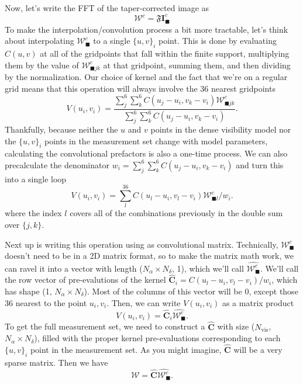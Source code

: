 \documentclass[modern]{aastex62}
\newcommand{\im}{\boldsymbol{I}_\blacksquare}
\newcommand{\vm}{\boldsymbol{\mathcal{W}}} %
\begin{document}
Now, let's write the FFT of the taper-corrected image as 
\begin{equation}
    \vm^c = \mathfrak{F} \im^c
\end{equation}
To make the interpolation/convolution process a bit more tractable, let's think about interpolating $\vm^c_\blacksquare$ to a single $\{u, v\}_i$ point. This is done by evaluating $C(u, v)$ at all of the gridpoints that fall within the finite support, multiplying them by the value of $\mathcal{W}^c_{\blacksquare jk}$ at that gridpoint, summing them, and then dividing by the normalization. Our choice of kernel and the fact that we're on a regular grid means that this operation will always involve the 36 nearest gridpoints
\begin{equation}
    V(u_i, v_i) = \frac{\sum_j^6 \sum_k^6 C(u_j - u_i, v_k - v_i) \mathcal{W}^c_{\blacksquare jk}}{\sum_j^6 \sum_k^6 C(u_j - u_i, v_k - v_i)}.
\end{equation}
Thankfully, because neither the $u$ and $v$ points in the dense visibility model nor the $\{u,v\}_i$ points in the measurement set change with model parameters, calculating the convolutional prefactors is also a one-time process. We can also precalculate the denominator $w_i = \sum_j^6 \sum_k^6 C(u_j - u_i, v_k - v_i)$ and turn this into a single loop
\begin{equation}
 V(u_i, v_i) = \sum_l^{36} C(u_l - u_i, v_l - v_i) \mathcal{W}^c_{\blacksquare l} / w_i.
 \end{equation}
 where the index $l$ covers all of the combinations previously in the double sum over $\{j, k\}$. 
 
 Next up is writing this operation using as convolutional matrix. Technically, $\vm^c_\blacksquare$ doesn't need to be in a 2D matrix format, so to make the matrix math work, we can ravel it into a vector with length ($N_\alpha \times N_\delta$, 1), which we'll call $\hat{\vm_\blacksquare^c}$. We'll call the row vector of pre-evalutions of the kernel $\hat{\boldsymbol{C}}_i = C(u_l - u_i, v_l - v_i) / w_i$, which has shape (1, $N_\alpha \times N_\delta$). Most of the columns of this vector will be $0$, except those 36 nearest to the point $u_i, v_i$. Then, we can write $V(u_i, v_i)$ as a matrix product
 \begin{equation}
     V(u_i, v_i) = \hat{\boldsymbol{C}}_i \hat{\vm_\blacksquare^c}.
 \end{equation}
 To get the full measurement set, we need to construct a $\hat{\boldsymbol{C}}$ with size ($N_\mathrm{vis}$, $N_\alpha \times N_\delta$), filled with the proper kernel pre-evaluations corresponding to each $\{u,v\}_i$ point in the measurement set. As you might imagine, $\hat{\boldsymbol{C}}$ will be a very sparse matrix. Then we have
  \begin{equation}
     \vm = \hat{\boldsymbol{C}} \hat{\vm_\blacksquare^c}.
 \end{equation}
\end{document}
